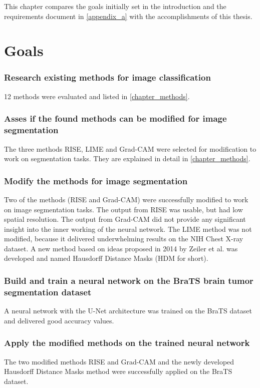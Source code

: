 This chapter compares the goals initially set in the introduction and the requirements document in \autoref{appendix_a}  with the accomplishments of this thesis.

\section{Goals}

\subsubsection{Research existing methods for image classification}
12 methods were evaluated and listed in \autoref{chapter_methods}.

\subsubsection{Asses if the found methods can be modified for image segmentation}
The three methods RISE, LIME and Grad-CAM were selected for modification to work on segmentation tasks. They are explained in detail in \autoref{chapter_methods}.

\subsubsection{Modify the methods for image segmentation}
Two of the methods (RISE and Grad-CAM) were successfully modified to work on image segmentation tasks. The output from RISE was usable, but had low spatial resolution. The output from Grad-CAM did not provide any significant insight into the inner working of the neural network.  The LIME method was not modified, because it delivered underwhelming results on the NIH Chest X-ray dataset. A new method based on ideas proposed in 2014 by Zeiler et al.\cite{zeiler2014visualizing} was developed and named Hausdorff Distance Masks (HDM for short).

\subsubsection{Build and train a neural network on the BraTS brain tumor segmentation dataset}
A neural network with the U-Net architecture was trained on the BraTS dataset and delivered good accuracy values.

\subsubsection{Apply the modified methods on the trained neural network}
The two modified methods RISE and Grad-CAM and the newly developed Hausdorff Distance Masks method were successfully applied on the BraTS dataset.

